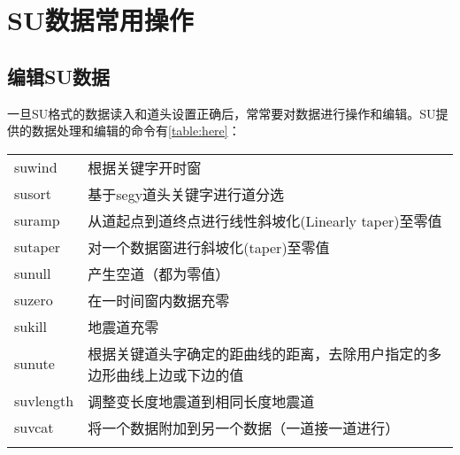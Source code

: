 \chapter{SU数据常用操作}
\section{编辑SU数据}
一旦SU格式的数据读入和道头设置正确后，常常要对数据进行操作和编辑。SU提供的数据处理和编辑的命令有\ref{table:here}：\par\mvspace
\begin{tabular}{lp{}}
	\toprule
	suwind & 根据关键字开时窗\\	
	susort & 基于segy道头关键字进行道分选\\	
	suramp & 从道起点到道终点进行线性斜坡化(Linearly taper)至零值\\	
	sutaper & 对一个数据窗进行斜坡化(taper)至零值\\	
	sunull & 产生空道（都为零值）\\	
	suzero & 在一时间窗内数据充零\\	
	sukill & 地震道充零\\	
	sunute & 根据关键道头字确定的距曲线的距离，去除用户指定的多边形曲线上边或下边的值\\	
	suvlength & 调整变长度地震道到相同长度地震道\\	
	suvcat & 将一个数据附加到另一个数据（一道接一道进行）\\
	\bottomrule
	\label{table:here}
\end{tabular}

